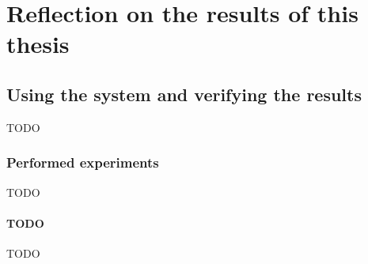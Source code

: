 

\part{Reflection on the results of this thesis}

\chapter{Using the system and verifying the results}
\label{ch:evaluation}
TODO

\section{Performed experiments}
\label{sec:performed_experiments}
TODO


\subsection{TODO}
\label{subsec:performed_experiments_XXX}
TODO

